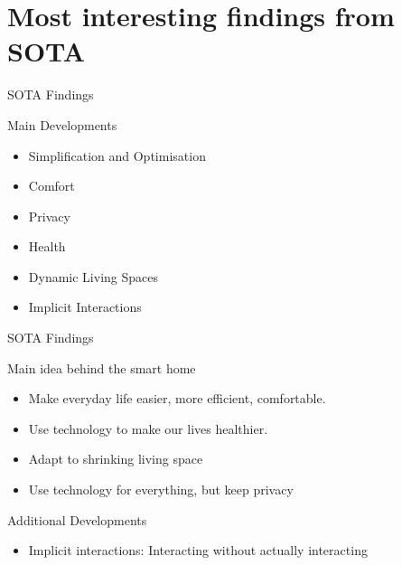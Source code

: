 \documentclass[10pt]{beamer}
\begin{document}

\section{Most interesting findings from SOTA}


\begin{frame}{SOTA Findings}
	\begin{block}{Main Developments}
	\begin{itemize}
		\item Simplification and Optimisation
		\item Comfort
		\item Privacy
		\item Health
		\item Dynamic Living Spaces
		\item Implicit Interactions
	\end{itemize}	
	\end{block}
\end{frame}


\begin{frame}{SOTA Findings}
	\begin{block}{Main idea behind the smart home}
		\begin{itemize}
		\item Make everyday life easier, more efficient, comfortable.
		\item Use technology to make our lives healthier.
		\item Adapt to shrinking living space
		\item Use technology for everything, but keep privacy
		\end{itemize}
	\end{block}

	\begin{exampleblock}{Additional Developments}
	\begin{itemize}
		\item Implicit interactions: Interacting without actually interacting
	\end{itemize}
\end{exampleblock}
	
\end{frame}
\end{document}
